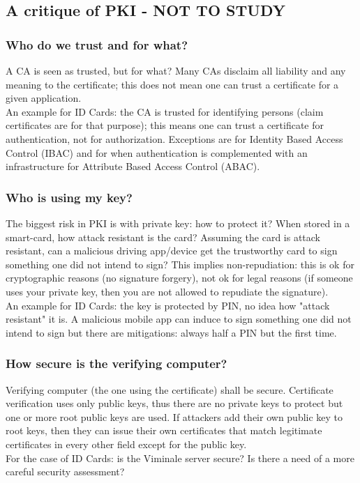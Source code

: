 \documentclass[a4paper, 10pt, titlepage]{article}
\begin{document}
\subsection{A critique of PKI - NOT TO STUDY}
\begin{footnotesize}
\subsubsection*{Who do we trust and for what?}
A CA is seen as trusted, but for what? Many CAs disclaim all liability
and any meaning to the certificate; this does not mean one can trust a certificate for a given application. \medskip\\
An example for ID Cards: the CA is trusted for identifying persons (claim certificates are for that purpose); this means one can trust a certificate for authentication, not for authorization. Exceptions are for Identity Based Access Control (IBAC) and for when authentication is complemented with an infrastructure for Attribute Based Access Control (ABAC).
\subsubsection*{Who is using my key?}
The biggest risk in PKI is with private key: how to protect it? When stored in a smart-card, how attack resistant is the card? Assuming the card is attack resistant, can a malicious driving app/device get the trustworthy card to sign something one did not intend to sign? This implies non-repudiation: this is ok for cryptographic reasons (no signature forgery), not ok for legal reasons (if someone uses your private key, then you are not allowed to repudiate the signature). \medskip\\
An example for ID Cards: the key is protected by PIN, no idea how "attack resistant" it is. A malicious mobile app can induce to sign something one did not intend to sign but there are mitigations: always half a PIN but the first time.
\subsubsection*{How secure is the verifying computer?}
Verifying computer (the one using the certificate) shall be secure. Certificate verification uses only public keys, thus there are no private keys to protect but one or more root public keys are used. If attackers add their own public key to root keys, then they can issue their own certificates that match legitimate certificates in every other field except for the public key. \medskip\\
For the case of ID Cards: is the Viminale server secure? Is there a need of a more careful security assessment?

\end{footnotesize}
\end{document}

